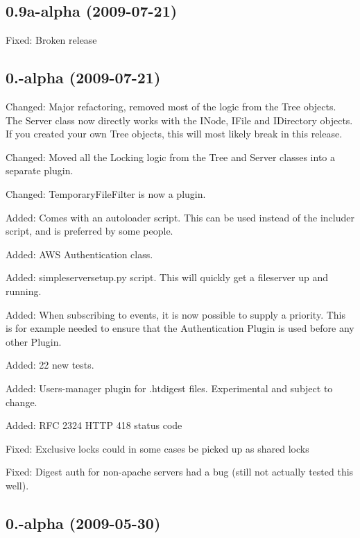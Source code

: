 \subsection*{0.\+9a-\/alpha (2009-\/07-\/21) }


\begin{DoxyItemize}
\item Fixed\+: Broken release
\end{DoxyItemize}

\subsection*{0.-\/alpha (2009-\/07-\/21) }


\begin{DoxyItemize}
\item Changed\+: Major refactoring, removed most of the logic from the Tree objects. The Server class now directly works with the I\+Node, I\+File and I\+Directory objects. If you created your own Tree objects, this will most likely break in this release.
\item Changed\+: Moved all the Locking logic from the Tree and Server classes into a separate plugin.
\item Changed\+: Temporary\+File\+Filter is now a plugin.
\item Added\+: Comes with an autoloader script. This can be used instead of the includer script, and is preferred by some people.
\item Added\+: A\+WS Authentication class.
\item Added\+: simpleserversetup.\+py script. This will quickly get a fileserver up and running.
\item Added\+: When subscribing to events, it is now possible to supply a priority. This is for example needed to ensure that the Authentication Plugin is used before any other Plugin.
\item Added\+: 22 new tests.
\item Added\+: Users-\/manager plugin for .htdigest files. Experimental and subject to change.
\item Added\+: R\+FC 2324 H\+T\+TP 418 status code
\item Fixed\+: Exclusive locks could in some cases be picked up as shared locks
\item Fixed\+: Digest auth for non-\/apache servers had a bug (still not actually tested this well).
\end{DoxyItemize}

\subsection*{0.-\/alpha (2009-\/05-\/30) }


